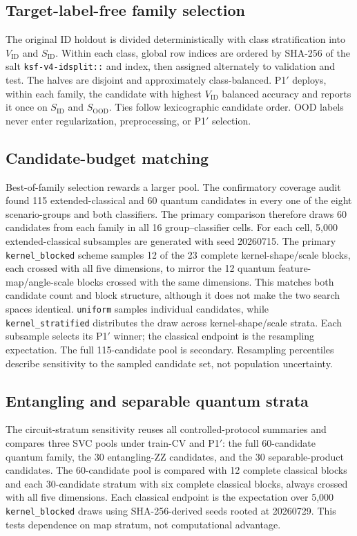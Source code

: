 \documentclass[referee,lineno,pdflatex,sn-vancouver-num]{sn-jnl}
\theoremstyle{thmstyleone}%
\theoremstyle{thmstyletwo}%
\theoremstyle{thmstylethree}%
\begin{document}
\subsection{Target-label-free family selection}

The original ID holdout is divided deterministically with class stratification into $V_{\mathrm{ID}}$ and $S_{\mathrm{ID}}$. Within each class, global row indices are ordered by SHA-256 of the salt \texttt{ksf-v4-idsplit::} and index, then assigned alternately to validation and test. The halves are disjoint and approximately class-balanced. P1$'$ deploys, within each family, the candidate with highest $V_{\mathrm{ID}}$ balanced accuracy and reports it once on $S_{\mathrm{ID}}$ and $S_{\mathrm{OOD}}$. Ties follow lexicographic candidate order. OOD labels never enter regularization, preprocessing, or P1$'$ selection.

\subsection{Candidate-budget matching}

Best-of-family selection rewards a larger pool. The confirmatory coverage audit found 115 extended-classical and 60 quantum candidates in every one of the eight scenario-groups and both classifiers. The primary comparison therefore draws 60 candidates from each family in all 16 group--classifier cells. For each cell, 5,000 extended-classical subsamples are generated with seed 20260715. The primary \texttt{kernel\_blocked} scheme samples 12 of the 23 complete kernel-shape/scale blocks, each crossed with all five dimensions, to mirror the 12 quantum feature-map/angle-scale blocks crossed with the same dimensions. This matches both candidate count and block structure, although it does not make the two search spaces identical. \texttt{uniform} samples individual candidates, while \texttt{kernel\_stratified} distributes the draw across kernel-shape/scale strata. Each subsample selects its P1$'$ winner; the classical endpoint is the resampling expectation. The full 115-candidate pool is secondary. Resampling percentiles describe sensitivity to the sampled candidate set, not population uncertainty.

\subsection{Entangling and separable quantum strata}

The circuit-stratum sensitivity reuses all controlled-protocol summaries and compares three SVC pools under train-CV and P1$'$: the full 60-candidate quantum family, the 30 entangling-ZZ candidates, and the 30 separable-product candidates. The 60-candidate pool is compared with 12 complete classical blocks and each 30-candidate stratum with six complete classical blocks, always crossed with all five dimensions. Each classical endpoint is the expectation over 5,000 \texttt{kernel\_blocked} draws using SHA-256-derived seeds rooted at 20260729. This tests dependence on map stratum, not computational advantage.
\end{document}
